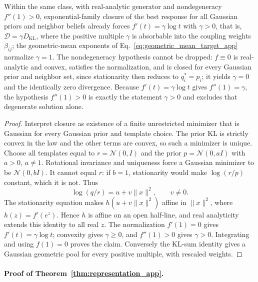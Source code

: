\begin{corollary}
\label{cor:closure_forces_kl}
Within the same class, with real-analytic generator and nondegeneracy $f''(1) > 0$, exponential-family closure of the best response for all Gaussian priors and neighbor beliefs already forces $f'(t) = \gamma \log t$ with $\gamma > 0$, that is, $\mathcal{D} = \gamma D_{\mathrm{KL}}$, where the positive multiple $\gamma$ is absorbable into the coupling weights $\beta_{ij}$; the geometric-mean exponents of Eq.~\eqref{eq:geometric_mean_target_app} normalize $\gamma = 1$. The nondegeneracy hypothesis cannot be dropped: $f \equiv 0$ is real-analytic and convex, satisfies the normalization, and is closed for every Gaussian prior and neighbor set, since stationarity then reduces to $q_i^* = p_i$; it yields $\gamma = 0$ and the identically zero divergence. Because $f'(t) = \gamma \log t$ gives $f''(1) = \gamma$, the hypothesis $f''(1) > 0$ is exactly the statement $\gamma > 0$ and excludes that degenerate solution alone.
\end{corollary}

\begin{proof}
Interpret closure as existence of a finite unrestricted minimizer that is Gaussian for every Gaussian prior and template choice. The prior KL is strictly convex in the law and the other terms are convex, so such a minimizer is unique. Choose all templates equal to $r=\mathcal N(0,I)$ and the prior $p=\mathcal N(0,aI)$ with $a>0$, $a\ne1$. Rotational invariance and uniqueness force a Gaussian minimizer to be $\mathcal N(0,bI)$. It cannot equal $r$: if $b=1$, stationarity would make $\log(r/p)$ constant, which it is not. Thus
\[
\log(q/r)=u+v\|x\|^2,\qquad v\ne0.
\]
The stationarity equation makes $h(u+v\|x\|^2)$ affine in $\|x\|^2$, where $h(z)=f'(e^z)$. Hence $h$ is affine on an open half-line, and real analyticity extends this identity to all real $z$. The normalization $f'(1)=0$ gives $f'(t)=\gamma\log t$; convexity gives $\gamma\ge0$, and $f''(1)>0$ gives $\gamma>0$. Integrating and using $f(1)=0$ proves the claim. Conversely the KL-sum identity gives a Gaussian geometric pool for every positive multiple, with rescaled weights.
\end{proof}

\paragraph{Proof of Theorem~\ref{thm:representation_app}.}

